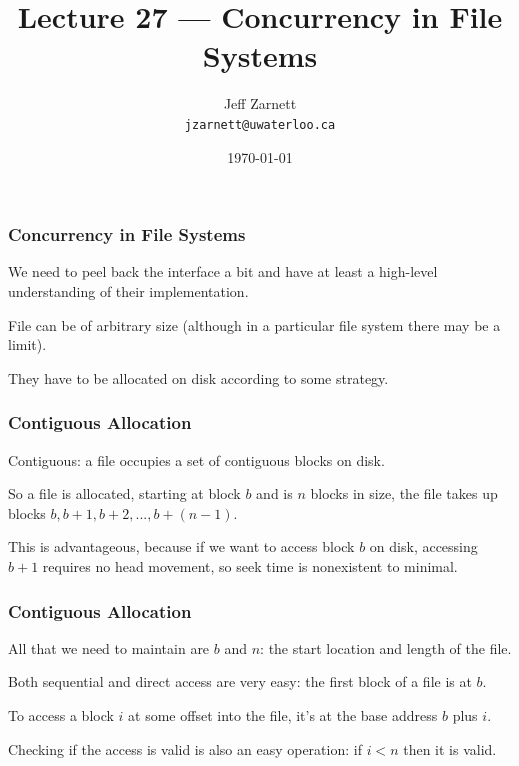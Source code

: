 

\title{Lecture 27 --- Concurrency in File Systems }

\author{Jeff Zarnett \\ \small \texttt{jzarnett@uwaterloo.ca}}
\date{\today}




\begin{frame}
	\titlepage

\end{frame}


\begin{frame}
	\frametitle{Concurrency in File Systems}

	We need to peel back the interface a bit and have at least a high-level understanding of their implementation.

	File can be of arbitrary size (although in a particular file system there may be a limit).

	They have to be allocated on disk according to some strategy.

\end{frame}

\begin{frame}
	\frametitle{Contiguous Allocation}
	Contiguous: a file occupies a set of contiguous blocks on disk.

	So a file is allocated, starting at block $b$ and is $n$ blocks in size, the file takes up blocks $b, b+1, b+2, ..., b+(n-1)$.

	This is advantageous, because if we want to access block $b$ on disk, accessing $b+1$ requires no head movement, so seek time is nonexistent to minimal.

\end{frame}

\begin{frame}
	\frametitle{Contiguous Allocation}

	All that we need to maintain are $b$ and $n$: the start location and length of the file.

	Both sequential and direct access are very easy: the first block of a file is at $b$.

	To access a block $i$ at some offset into the file, it's at the base address $b$ plus $i$.

	Checking if the access is valid is also an easy operation: if $i < n$ then it is valid.

\end{frame}

